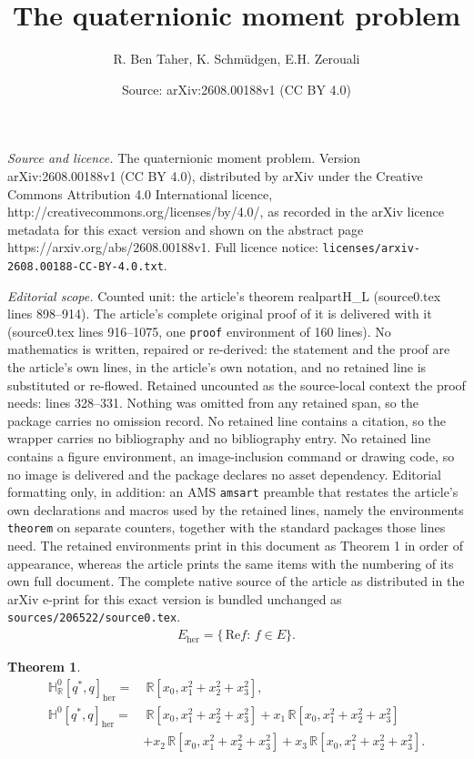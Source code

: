 \documentclass[10pt,a4paper]{amsart}
\title{The quaternionic moment problem}
\author{R. Ben Taher, K. Schm\"udgen, E.H. Zerouali}
\date{Source: arXiv:2608.00188v1 (CC BY 4.0)}
\newtheorem{theorem}{Theorem}
\begin{document}
\maketitle

\noindent\emph{Source and licence.} The quaternionic moment problem. Version arXiv:2608.00188v1 (CC BY 4.0), distributed by arXiv under the Creative Commons Attribution 4.0 International licence, http://creativecommons.org/licenses/by/4.0/, as recorded in the arXiv licence metadata for this exact version and shown on the abstract page https://arxiv.org/abs/2608.00188v1. Full licence notice: \texttt{licenses/arxiv-2608.00188-CC-BY-4.0.txt}.\par\smallskip

\noindent\textit{Editorial scope.} Counted unit: the article's theorem realpartH\_L (source0.tex lines 898--914). The article's complete original proof of it is delivered with it (source0.tex lines 916--1075, one \texttt{proof} environment of 160 lines). No mathematics is written, repaired or re-derived: the statement and the proof are the article's own lines, in the article's own notation, and no retained line is substituted or re-flowed.  Retained uncounted as the source-local context the proof needs: lines 328--331.  Nothing was omitted from any retained span, so the package carries no omission record.  No retained line contains a citation, so the wrapper carries no bibliography and no bibliography entry.  No retained line contains a figure environment, an image-inclusion command or drawing code, so no image is delivered and the package declares no asset dependency.  Editorial formatting only, in addition: an AMS \texttt{amsart} preamble that restates the article's own declarations and macros used by the retained lines, namely the environments \texttt{theorem} on separate counters, together with the standard packages those lines need.  The retained environments print in this document as Theorem 1 in order of appearance, whereas the article prints the same items with the numbering of its own full document.  The complete native source of the article as distributed in the arXiv e-print for this exact version is bundled unchanged as \texttt{sources/206522/source0.tex}.
\begin{align}
\label{EherRe}
E_{\mathrm{her}}=\{\, \mathrm{Re}f: \, f\in E\}.
\end{align}

\begin{theorem}%
\label{realpartH_L}
%
\begin{align}
\label{herpart}
\mathbb{H}^{0}_{\mathbb{R}}[q^{*}, q]_{\mathrm{her}} =& ~\mathbb{R}[x_{0},x_{1}^{2}+x_{2}^{2}+x_{3}^{2}],
\\
\mathbb{H}^{0}[q^{*}, q]_{\mathrm{her}} =& ~\mathbb{R}[x_{0},x_{1}^{2}+x_{2}^{2}+x_{3}^{2}]
+ x_{1}\, \mathbb{R}[x_{0},x_{1}^{2}+x_{2}^{2}+x_{3}^{2}]
\label{herpart1}
\\
&+x_{2}\, \mathbb{R}[x_{0},x_{1}^{2}+x_{2}^{2}+x_{3}^{2}]+ x_{3}\,
\mathbb{R}[x_{0},x_{1}^{2}+x_{2}^{2}+x_{3}^{2}].
\nonumber
\end{align}
%
\end{theorem}
\end{document}
